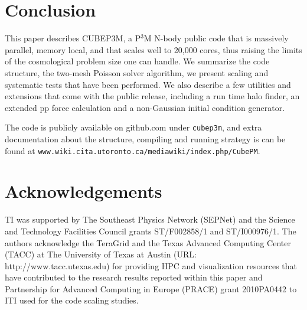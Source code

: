 \section{Conclusion}

This paper describes {\small CUBEP3M}, a P$^3$M N-body public code that is massively parallel, memory local, 
and that scales well to 20,000 cores, thus raising the limits of the cosmological problem size one can handle.
We summarize the code structure, the two-mesh Poisson solver algorithm, we present scaling and systematic tests
that have been performed. We also describe a few utilities and extensions that come with the public release, 
including a run time halo finder, an extended pp force calculation and a non-Gaussian initial condition generator.

The code is publicly available on github.com under {\tt cubep3m}, and extra documentation about the structure, 
compiling and running strategy is can be found at {\tt www.wiki.cita.utoronto.ca/mediawiki/index.php/CubePM}.

\section*{Acknowledgements}

TI was supported by The Southeast Physics
Network (SEPNet) and the Science and Technology Facilities Council
grants ST/F002858/1 and ST/I000976/1. The authors acknowledge the
TeraGrid and the Texas Advanced Computing Center (TACC) at The
University of Texas at Austin (URL: http://www.tacc.utexas.edu) for
providing HPC and visualization resources that have contributed to the
research results reported within this paper and Partnership for Advanced
Computing in Europe (PRACE) grant 2010PA0442 to ITI used for the code
scaling studies. 